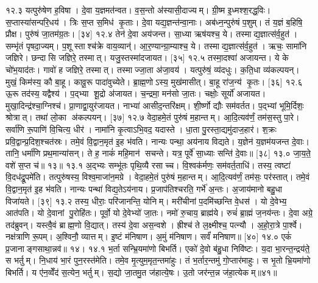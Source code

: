 १२.३
यत्पुरु॑षेण ह॒विषा। दे॒वा य॒ज्ञमत॑न्वत। व॒स॒न्तो अ॑स्यासी॒दाज्यम्। ग्री॒ष्म इ॒ध्मश्श॒रद्ध॒विः। स॒प्तास्या॑सन्परि॒धय॑। त्रिः स॒प्त स॒मिध॑ कृ॒ताः। दे॒वा यद्य॒ज्ञन्त॑न्वा॒नाः। अब॑ध्न॒न्पुरु॑षं प॒शुम्। तं य॒ज्ञं ब॒\ar{}हिषि॒ प्रौक्ष\sn{}। पुरु॑षं जा॒तम॑ग्र॒तः। [३४]
१२.४
तेन॑ दे॒वा अय॑जन्त। सा॒ध्या ऋष॑यश्च॒ ये। तस्माद्य॒ज्ञात्स॑र्व॒हुत॑। सम्भृ॑तं पृषदा॒ज्यम्। प॒शूस्ताश्च॑क्रे वाय॒व्यान्॑। आ॒र॒ण्यान्ग्रा॒म्याश्च॒ ये। तस्माद्य॒ज्ञात्स॑र्व॒हुत॑। ऋचः॒ सामा॑नि जज्ञिरे। छन्दासि जज्ञिरे॒ तस्मात्। यजु॒स्तस्मा॑दजायत। [३५]
१२.५
तस्मा॒दश्वा॑ अजायन्त। ये के चो॑भ॒याद॑तः। गावो॑ ह जज्ञिरे॒ तस्मात्। तस्माज्जा॒ता अ॑जा॒वय॑। यत्पुरु॑षं॒ व्य॑दधुः। क॒ति॒धा व्य॑कल्पयन्। मुखं॒ किम॑स्य॒ कौ बा॒हू। कावू॒रू पादा॑वुच्येते। ब्रा॒ह्म॒णोऽस्य॒ मुख॑मासीत्। बा॒हू रा॑ज॒न्य॑ कृ॒तः। [३६]
१२.६
ऊ॒रू तद॑स्य॒ यद्वैश्य॑। प॒द्भ्या शू॒द्रो अ॑जायत। च॒न्द्रमा॒ मन॑सो जा॒तः। चक्षोः॒ सूर्यो॑ अजायत। मुखा॒दिन्द्र॑श्चा॒ग्निश्च॑। प्रा॒णाद्वा॒युर॑जायत। नाभ्या॑ आसीद॒न्तरि॑क्षम्। शी॒र्ष्णो द्यौः सम॑वर्तत। प॒द्भ्यां भूमि॒र्दिशः॒ श्रोत्रात्। तथा॑ लो॒का अ॑कल्पयन्। [३७]
१२.७
वेदा॒हमे॒तं पुरु॑षं म॒हान्तम्। आ॒दि॒त्यव॑र्णं॒ तम॑स॒स्तु पा॒रे। सर्वा॑णि रू॒पाणि॑ वि॒चित्य॒ धीर॑। नामा॑नि कृ॒त्वाऽभि॒वद॒\an{} यदास्ते। धा॒ता पु॒रस्ता॒द्यमु॑दाज॒हार॑। श॒क्रः प्रवि॒द्वान्प्र॒दिश॒श्चत॑स्रः। तमे॒वं वि॒द्वान॒मृत॑ इ॒ह भ॑वति। नान्यः पन्था॒ अय॑नाय विद्यते। य॒ज्ञेन॑ य॒ज्ञम॑यजन्त दे॒वाः। तानि॒ धर्मा॑णि प्रथ॒मान्या॑सन्। ते ह॒ नाकं॑ महि॒मान॑ सचन्ते। यत्र॒ पूर्वे॑ सा॒ध्याः सन्ति॑ दे॒वाः॥ [३८]
१३.०
जा॒य॒ते॒ वशे॑ स॒प्त च॑॥ १३॥
\anuvakamend
१३.१
अ॒द्भ्यः सम्भू॑तः पृथि॒व्यै रसाच्च। वि॒श्वक॑र्मणः॒ सम॑वर्त॒ताधि॑। तस्य॒ त्वष्टा॑ वि॒दध॑द्रू॒पमे॑ति। तत्पुरु॑षस्य॒ विश्व॒माजा॑न॒मग्रे। वेदा॒हमे॒तं पुरु॑षं म॒हान्तम्। आ॒दि॒त्यव॑र्णं॒ तम॑सः॒ पर॑स्तात्। तमे॒वं वि॒द्वान॒मृत॑ इ॒ह भ॑वति। नान्यः पन्था॑ विद्य॒तेऽय॑नाय। प्र॒जाप॑तिश्चरति॒ गर्भे॑ अ॒न्तः। अ॒जाय॑मानो बहु॒धा विजा॑यते। [३९]
१३.२
तस्य॒ धीराः॒ परि॑जानन्ति॒ योनिम्। मरी॑चीनां प॒दमि॑च्छन्ति वे॒धस॑। यो दे॒वेभ्य॒ आत॑पति। यो दे॒वानां पु॒रोहि॑तः। पूर्वो॒ यो दे॒वेभ्यो॑ जा॒तः। नमो॑ रु॒चाय॒ ब्राह्म॑ये। रुचं॑ ब्रा॒ह्मं ज॒नय॑न्तः। दे॒वा अग्रे॒ तद॑ब्रुवन्। यस्त्वै॒वं ब्राह्म॒णो वि॒द्यात्। तस्य॑ दे॒वा अस॒न्वशे। ह्रीश्च॑ ते ल॒क्ष्मीश्च॒ पत्न्यौ। अ॒हो॒रा॒त्रे पा॒र्श्वे। नक्ष॑त्राणि रू॒पम्। अ॒श्विनौ॒ व्यात्तम्। इ॒ष्टं म॑निषाण। अ॒मुं म॑निषाण। सर्वं॑ मनिषाण॥ [४०]
१४.०
एकं॑ प्र॒जानाङ्गसाथा॒न्नव॑॥ १४।
\anuvakamend
१४.१
भ॒र्ता सन्भ्रि॒यमा॑णो बिभर्ति। एको॑ दे॒वो ब॑हु॒धा निवि॑ष्टः। य॒दा भा॒रन्त॒न्द्रय॑ते॒ स भर्तुम्। नि॒धाय॑ भा॒रं पुन॒रस्त॑मेति। तमे॒व मृ॒त्युम॒मृत॒न्तमा॑हुः। तं भ॒र्तार॒न्तमु॑ गो॒प्तार॑माहुः। स भृ॒तो भ्रि॒यमा॑णो बिभर्ति। य ए॑न॒व्वेँद॑ स॒त्येन॒ भर्तुम्। स॒द्यो जा॒तमु॒त ज॑हात्ये॒षः। उ॒तो जर॑न्त॒न्न ज॑हा॒त्येकम्॥४१॥
